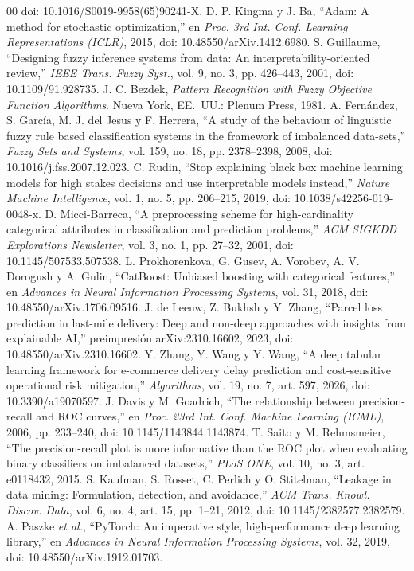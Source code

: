 \documentclass[conference]{IEEEtran}
\begin{document}
\begin{thebibliography}{00}
doi: 10.1016/S0019-9958(65)90241-X.
 D. P. Kingma y J. Ba, ``Adam: A method for stochastic
optimization,'' en \textit{Proc. 3rd Int. Conf. Learning Representations
(ICLR)}, 2015, doi: 10.48550/arXiv.1412.6980.
 S. Guillaume, ``Designing fuzzy inference systems from
data: An interpretability-oriented review,'' \textit{IEEE Trans. Fuzzy
Syst.}, vol. 9, no. 3, pp. 426--443, 2001, doi: 10.1109/91.928735.
 J. C. Bezdek, \textit{Pattern Recognition with Fuzzy
Objective Function Algorithms}. Nueva York, EE.~UU.: Plenum Press, 1981.
 A. Fernández, S. García, M. J. del Jesus y F. Herrera,
``A study of the behaviour of linguistic fuzzy rule based classification
systems in the framework of imbalanced data-sets,'' \textit{Fuzzy Sets and
Systems}, vol. 159, no. 18, pp. 2378--2398, 2008,
doi: 10.1016/j.fss.2007.12.023.
 C. Rudin, ``Stop explaining black box machine learning models
for high stakes decisions and use interpretable models instead,''
\textit{Nature Machine Intelligence}, vol. 1, no. 5, pp. 206--215, 2019,
doi: 10.1038/s42256-019-0048-x.
 D. Micci-Barreca, ``A preprocessing scheme for
high-cardinality categorical attributes in classification and prediction
problems,'' \textit{ACM SIGKDD Explorations Newsletter}, vol. 3, no. 1,
pp. 27--32, 2001, doi: 10.1145/507533.507538.
 L. Prokhorenkova, G. Gusev, A. Vorobev, A. V. Dorogush y
A. Gulin, ``CatBoost: Unbiased boosting with categorical features,'' en
\textit{Advances in Neural Information Processing Systems}, vol. 31, 2018,
doi: 10.48550/arXiv.1706.09516.
 J. de Leeuw, Z. Bukhsh y Y. Zhang, ``Parcel loss prediction
in last-mile delivery: Deep and non-deep approaches with insights from
explainable AI,'' preimpresión arXiv:2310.16602, 2023,
doi: 10.48550/arXiv.2310.16602.
 Y. Zhang, Y. Wang y Y. Wang, ``A deep tabular learning
framework for e-commerce delivery delay prediction and cost-sensitive
operational risk mitigation,'' \textit{Algorithms}, vol. 19, no. 7, art. 597,
2026, doi: 10.3390/a19070597.
 J. Davis y M. Goadrich, ``The relationship between
precision-recall and ROC curves,'' en \textit{Proc. 23rd Int. Conf. Machine
Learning (ICML)}, 2006, pp. 233--240, doi: 10.1145/1143844.1143874.
 T. Saito y M. Rehmsmeier, ``The precision-recall plot is more
informative than the ROC plot when evaluating binary classifiers on imbalanced
datasets,'' \textit{PLoS ONE}, vol. 10, no. 3, art. e0118432, 2015.
 S. Kaufman, S. Rosset, C. Perlich y O. Stitelman, ``Leakage
in data mining: Formulation, detection, and avoidance,'' \textit{ACM Trans.
Knowl. Discov. Data}, vol. 6, no. 4, art. 15, pp. 1--21, 2012,
doi: 10.1145/2382577.2382579.
 A. Paszke \textit{et al.}, ``PyTorch: An imperative style,
high-performance deep learning library,'' en \textit{Advances in Neural
Information Processing Systems}, vol. 32, 2019,
doi: 10.48550/arXiv.1912.01703.
\end{thebibliography}
\end{document}
